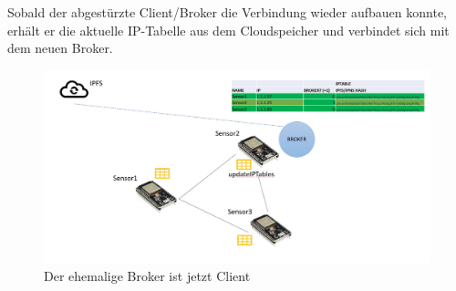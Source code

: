 \documentclass{article}
\begin{document}
Sobald der abgestürzte Client/Broker die Verbindung wieder aufbauen konnte, erhält er die aktuelle IP-Tabelle aus dem Cloudspeicher und verbindet sich mit dem neuen Broker.

\begin{figure}[h]
    \centering
    \includegraphics[width=1\linewidth]{Porposal/Bild5.jpg}
    \caption{Der ehemalige Broker ist jetzt Client}
    \label{fig:statemachine}
\end{figure}
\end{document}
